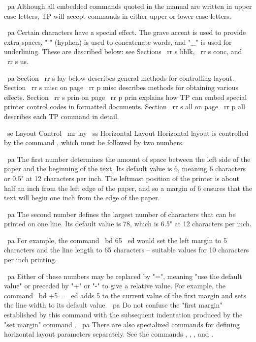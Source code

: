 ~pa Although all embedded commands quoted in the manual are written in
upper case letters, TP will accept commands in either upper or lower case
letters.

~pa Certain characters have a special effect.
The grave accent is used to provide extra spaces, "-" (hyphen) is
used to concatenate words, and "_" is used for underlining.
These are described below: see Sections ~rr s hblk, ~rr s conc, and ~rr s us.

~pa Section ~rr s lay below describes general methods for controlling layout.
Section ~rr s misc on page ~rr p misc describes methods for obtaining various
effects.
Section ~rr s prin on page ~rr p prin explains how TP can embed special 
printer control codes in formatted documents.
Section ~rr s all on page ~rr p all describes each TP command in detail.

~se Layout Control
~mr lay
~ss Horizontal Layout
Horizontal layout is controlled by the command \HL, which must be followed
by two numbers.

~pa The first number determines the amount of space between the left side of
the paper and the beginning of the text.
Its default value is 6, meaning 6 characters or 0.5" at 12 characters per
inch.
The leftmost position of the printer is about half an inch from the left
edge of the paper, and so a margin of 6 ensures that the text will begin
one inch from the edge of the paper.

~pa The second number defines the largest number of characters that can be
printed on one line.
Its default value is 78, which is 6.5" at 12 characters per inch.

~pa For example, the command ~bd  65 ~ed
would set the left margin to 5 characters and the line length to 65
characters -- suitable values for 10 characters per inch printing.

~pa Either of these numbers may be replaced by "=", meaning "use the default
value" or preceded by "+" or "-" to give a relative value.
For example, the command
~bd \HL +5 = ~ed
adds 5 to the current value of the first margin and sets the line width
to its default value.
~pa Do not confuse the "first margin" established by this command with
the subsequent indentation produced by the "set margin" command \SM.
~pa There are also specialized commands for defining horizontal layout
parameters separately.
See the commands \DL, \IL, \PL, and \SL.

